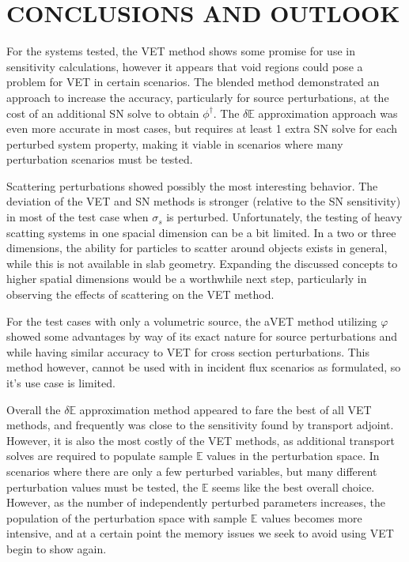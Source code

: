 \documentclass[12pt]{report}
\newcommand{\Edd}{\mathbb{E}}
\newcommand{\sigs}{\sigma_s}
\begin{document}
\chapter{\uppercase {Conclusions and Outlook}} \label{chap:conclusion}

For the systems tested, the VET method shows some promise for use in sensitivity calculations, however it appears that void regions could pose a problem for VET in certain scenarios. The blended method demonstrated an approach to increase the accuracy, particularly for source perturbations, at the cost of an additional SN solve to obtain $\phi^\dag$. The $\delta \Edd$ approximation approach was even more accurate in most cases, but requires at least 1 extra SN solve for each perturbed system property, making it viable in scenarios where many perturbation scenarios must be tested. 

Scattering perturbations showed possibly the most interesting behavior. The deviation of the VET and SN methods is stronger (relative to the SN sensitivity) in most of the test case when $\sigs$ is perturbed. Unfortunately, the testing of heavy scatting systems in one spacial dimension can be a bit limited. In a two or three dimensions, the ability for particles to scatter around objects exists in general, while this is not available in slab geometry. Expanding the discussed concepts to higher spatial dimensions would be a worthwhile next step, particularly in observing the effects of scattering on the VET method.

For the test cases with only a volumetric source, the aVET method utilizing $\varphi$ showed some advantages by way of its exact nature for source perturbations and while having similar accuracy to VET for cross section perturbations. This method however, cannot be used with in incident flux scenarios as formulated, so it's use case is limited.

Overall the $\delta \Edd$ approximation method appeared to fare the best of all VET methods, and frequently was close to the sensitivity found by transport adjoint. However, it is also the most costly of the VET methods, as additional transport solves are required to populate sample $\Edd$ values in the perturbation space. In scenarios where there are only a few perturbed variables, but many different perturbation values must be tested, the $\Edd$ seems like the best overall choice. However, as the number of independently perturbed parameters increases, the population of the perturbation space with sample $\Edd$ values becomes more intensive, and at a certain point the memory issues we seek to avoid using VET begin to show again.
\end{document}
